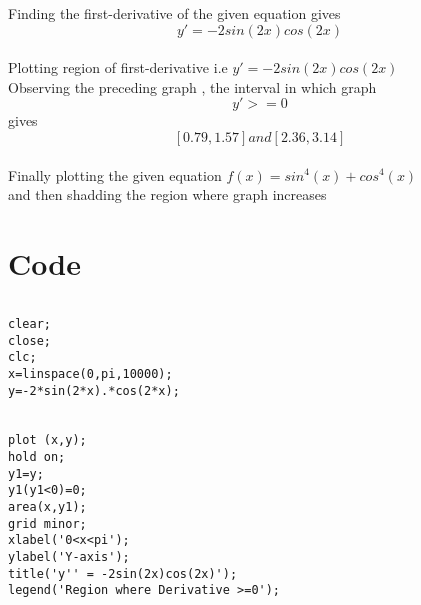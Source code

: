 \begin{flushleft}
Finding the first-derivative of the given equation gives 
\[y' =-2 sin(2x) cos(2x)\]
\\
Plotting region of first-derivative i.e \(y' =-2 sin(2x) cos(2x)\)\\
Observing the preceding graph , the interval in which graph \[y' >=0\]
gives \[[0.79,1.57]  and  [2.36,3.14]\] \\
Finally plotting the given equation \(f(x) = sin^4(x) + cos^4(x)\)\\
and then  shadding the region where graph increases

\end{flushleft}


\vspace{78mm}

\section{Code }
\lstset{language=Octave}

\begin{lstlisting}[frame=single]
\end{lstlisting}


\begin{lstlisting}[frame=single]
clear;
close;
clc;
x=linspace(0,pi,10000);
y=-2*sin(2*x).*cos(2*x);


plot (x,y);
hold on;
y1=y;
y1(y1<0)=0;
area(x,y1);
grid minor;
xlabel('0<x<pi'); 
ylabel('Y-axis');
title('y'' = -2sin(2x)cos(2x)');
legend('Region where Derivative >=0');
\end{lstlisting}

%
